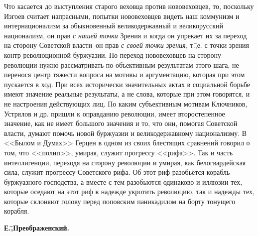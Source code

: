 Что касается до выступления старого веховца против нововеховцев, то, поскольку Изгоев считает напрасными, попытки нововеховцев видеть наш коммунизм и интернационализм за обыкновенный великодержавный и великорусский национализм, он прав \emph{с нашей точки} Зрения и когда он упрекает их за переход на сторону Советской власти\---он прав \emph{с своей точки зрения,} т.\=,е. с точки зрения контр революционной буржуазии. Но переход нововеховцев на сторону революции нужно рассматривать по объективным результатам этого шага, не перенося центр тяжести вопроса на мотивы и аргументацию, которая при этом пускается в ход. При всех исторически значительных актах в социальной борьбе имеют значение реальные результаты, а не слова, которые при этом говорятся, и не настроения действующих лиц. По каким субъективным мотивам Ключников, Устрялов и др. пришли к оправданию революции, имеет второстепенное значение, как не имеет большого значения и то, что они, помогая Советской власти, думают помочь новой буржуазии и великодержавному национализму. В <<Былом и Думах>> Герцен в одном из своих блестящих сравнений говорил о том, что <<полип>>, умирая, служит прогрессу <<рифа>>. Так и часть интеллигенции, переходя на сторону революции и умирая, как белогвардейская сила, служит прогрессу Советского рифа. Об этот риф разобьётся корабль буржуазного господства, а вместе с тем разобьются одинаково и иллюзии тех, которые оседают на этот риф в надежде укротить революцию, так и надежды тех, которые склоняют голову перед поповским паникадилом на борту тонущего корабля.


\begin{flushright}
 \textbf{Е.\=,Преображенский.}\hspace*{2em}
\end{flushright}
